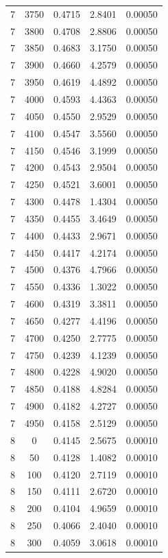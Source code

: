 \begin{longtable}{ccccc}
    7 & 3750 & 0.4715 & 2.8401 & 0.00050 \\
    7 & 3800 & 0.4708 & 2.8806 & 0.00050 \\
    7 & 3850 & 0.4683 & 3.1750 & 0.00050 \\
    7 & 3900 & 0.4660 & 4.2579 & 0.00050 \\
    7 & 3950 & 0.4619 & 4.4892 & 0.00050 \\
    7 & 4000 & 0.4593 & 4.4363 & 0.00050 \\
    7 & 4050 & 0.4550 & 2.9529 & 0.00050 \\
    7 & 4100 & 0.4547 & 3.5560 & 0.00050 \\
    7 & 4150 & 0.4546 & 3.1999 & 0.00050 \\
    7 & 4200 & 0.4543 & 2.9504 & 0.00050 \\
    7 & 4250 & 0.4521 & 3.6001 & 0.00050 \\
    7 & 4300 & 0.4478 & 1.4304 & 0.00050 \\
    7 & 4350 & 0.4455 & 3.4649 & 0.00050 \\
    7 & 4400 & 0.4433 & 2.9671 & 0.00050 \\
    7 & 4450 & 0.4417 & 4.2174 & 0.00050 \\
    7 & 4500 & 0.4376 & 4.7966 & 0.00050 \\
    7 & 4550 & 0.4336 & 1.3022 & 0.00050 \\
    7 & 4600 & 0.4319 & 3.3811 & 0.00050 \\
    7 & 4650 & 0.4277 & 4.4196 & 0.00050 \\
    7 & 4700 & 0.4250 & 2.7775 & 0.00050 \\
    7 & 4750 & 0.4239 & 4.1239 & 0.00050 \\
    7 & 4800 & 0.4228 & 4.9020 & 0.00050 \\
    7 & 4850 & 0.4188 & 4.8284 & 0.00050 \\
    7 & 4900 & 0.4182 & 4.2727 & 0.00050 \\
    7 & 4950 & 0.4158 & 2.5129 & 0.00050 \\
    8 & 0 & 0.4145 & 2.5675 & 0.00010 \\
    8 & 50 & 0.4128 & 1.4082 & 0.00010 \\
    8 & 100 & 0.4120 & 2.7119 & 0.00010 \\
    8 & 150 & 0.4111 & 2.6720 & 0.00010 \\
    8 & 200 & 0.4104 & 4.9659 & 0.00010 \\
    8 & 250 & 0.4066 & 2.4040 & 0.00010 \\
    8 & 300 & 0.4059 & 3.0618 & 0.00010 \\

\end{longtable}
